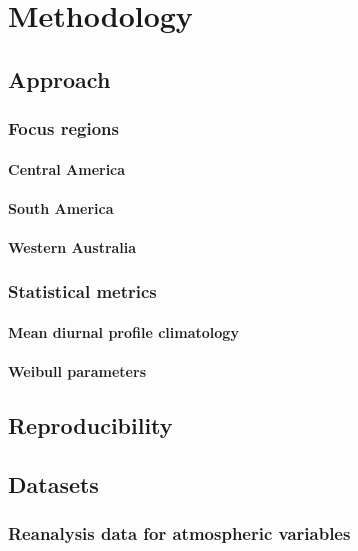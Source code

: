 \chapter{Methodology}

\section{Approach}

\subsection{Focus regions}

\subsubsection{Central America}

\subsubsection{South America}

\subsubsection{Western Australia}

\subsection{Statistical metrics}

\subsubsection{Mean diurnal profile climatology}

\subsubsection{Weibull parameters}

\section{Reproducibility}

\section{Datasets}

\subsection{Reanalysis data for atmospheric variables}

